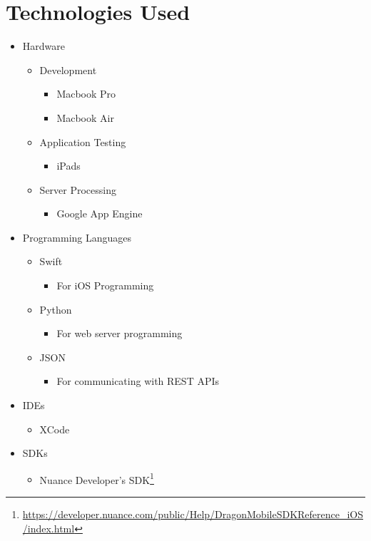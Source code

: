 \chapter{Technologies Used}

\begin{itemize}
    \item Hardware
    \begin{itemize}
   	 \item Development
	 \begin{itemize}
   	 	\item Macbook Pro
		\item Macbook Air
	\end{itemize}
	 \item Application Testing
	  \begin{itemize}
   	 	\item iPads
	\end{itemize}
	 \item Server Processing
	  \begin{itemize}
		\item Google App Engine
	\end{itemize}
    \end{itemize}
    \item Programming Languages
     \begin{itemize}
   	 	\item Swift
		 \begin{itemize}
   	 		\item For iOS Programming
		\end{itemize}
		\item Python
		 \begin{itemize}
   	 		\item For web server programming
		\end{itemize}
		\item JSON
		\begin{itemize}
   	 		\item For communicating with REST APIs
		\end{itemize}
	\end{itemize}
    \item IDEs
     \begin{itemize}
   	 	\item XCode
	\end{itemize}
 \item SDKs
     \begin{itemize}
		\item Nuance Developer's SDK\footnote[1]{\url{https://developer.nuance.com/public/Help/DragonMobileSDKReference_iOS/index.html}}

\end{itemize}
\end{itemize}
